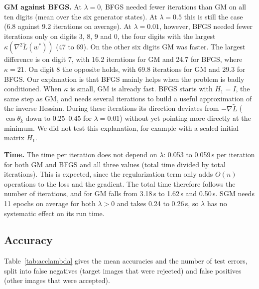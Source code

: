 \textbf{GM against BFGS.} At $\lambda=0$, BFGS needed fewer iterations than GM on all ten digits (mean over the six generator states). At $\lambda=0.5$ this is still the case (6.8 against 9.2 iterations on average). At $\lambda=0.01$, however, BFGS needed fewer iterations only on digits 3, 8, 9 and 0, the four digits with the largest $\kappa(\nabla^2\tilde L(w^*))$ (47 to 69). On the other six digits GM was faster. The largest difference is on digit 7, with 16.2 iterations for GM and 24.7 for BFGS, where $\kappa=21$. On digit 8 the opposite holds, with 69.8 iterations for GM and 29.3 for BFGS. Our explanation is that BFGS mainly helps when the problem is badly conditioned. When $\kappa$ is small, GM is already fast. BFGS starts with $H_1=I$, the same step as GM, and needs several iterations to build a useful approximation of the inverse Hessian. During these iterations its direction deviates from $-\nabla\tilde L$ ($\cos\theta_k$ down to 0.25--0.45 for $\lambda=0.01$) without yet pointing more directly at the minimum. We did not test this explanation, for example with a scaled initial matrix $H_1$.

\textbf{Time.} The time per iteration does not depend on $\lambda$: 0.053 to 0.059\,s per iteration for both GM and BFGS and all three values (total time divided by total iterations). This is expected, since the regularization term only adds $O(n)$ operations to the loss and the gradient. The total time therefore follows the number of iterations, and for GM falls from 3.18\,s to 1.62\,s and 0.50\,s. SGM needs 11 epochs on average for both $\lambda>0$ and takes 0.24 to 0.26\,s, so $\lambda$ has no systematic effect on its run time.

\subsection{Accuracy}\label{sec:lambdaacc}

Table~\ref{tab:acclambda} gives the mean accuracies and the number of test errors, split into false negatives (target images that were rejected) and false positives (other images that were accepted).

